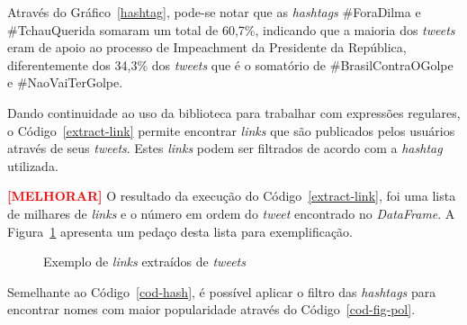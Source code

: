 Através do Gráfico~\ref{hashtag}, pode-se notar que as \textit{hashtags} \#ForaDilma e \#TchauQuerida somaram um total de 60,7\%, indicando que a maioria dos \textit{tweets} eram de apoio ao processo de Impeachment da Presidente da República, diferentemente dos 34,3\% dos \textit{tweets} que é o somatório de \#BrasilContraOGolpe e \#NaoVaiTerGolpe.

Dando continuidade ao uso da biblioteca para trabalhar com expressões regulares, o Código~\ref{extract-link} permite encontrar \textit{links} que são publicados pelos usuários através de seus \textit{tweets}. Estes \textit{links} podem ser filtrados de acordo com a \textit{hashtag} utilizada.



\textbf{\textcolor{red}{[MELHORAR]}} O resultado da execução do Código~\ref{extract-link}, foi uma lista de milhares de \textit{links} e o número em ordem do \textit{tweet} encontrado no \textit{DataFrame}. A Figura~\ref{links} apresenta um pedaço desta lista para exemplificação.

\begin{figure}[h]
	\centering
	\caption{Exemplo de \textit{links} extraídos de \textit{tweets}}
	\vspace{-0.3cm}
	\label{links}
\end{figure}

Semelhante ao Código~\ref{cod-hash}, é possível aplicar o filtro das \textit{hashtags} para encontrar nomes com maior popularidade através do Código~\ref{cod-fig-pol}.



